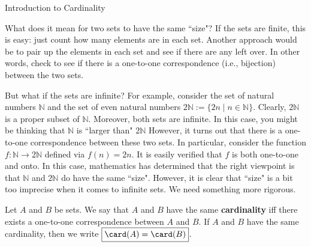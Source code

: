 \begin{section}{Introduction to Cardinality}

What does it mean for two sets to have the same ``size"?  If the sets are finite, this is easy: just count how many elements are in each set.  Another approach would be to pair up the elements in each set and see if there are any left over.  In other words, check to see if there is a one-to-one correspondence (i.e., bijection) between the two sets.  

But what if the sets are infinite?  For example, consider the set of natural numbers $\mathbb{N}$ and the set of even natural numbers $2\mathbb{N}:=\{2n\mid n\in \mathbb{N}\}$. Clearly, $2\mathbb{N}$ is a proper subset of $\mathbb{N}$.  Moreover, both sets are infinite.  In this case, you might be thinking that $\mathbb{N}$ is ``larger than" $2\mathbb{N}$  However, it turns out that there is a one-to-one correspondence between these two sets.  In particular, consider the function $f:\mathbb{N}\to 2\mathbb{N}$ defined via $f(n)=2n$.  It is easily verified that $f$ is both one-to-one and onto.  In this case, mathematics has determined that the right viewpoint is that $\mathbb{N}$ and $2\mathbb{N}$ do have the same ``size". However, it is clear that ``size" is a bit too imprecise when it comes to infinite sets. We need something more rigorous.

\begin{definition}
Let $A$ and $B$ be sets. We say that $A$ and $B$ have the same \textbf{cardinality} iff there exists a one-to-one correspondence between $A$ and $B$. If $A$ and $B$ have the same cardinality, then we write $\boxed{\card(A)=\card(B)}$.
\end{definition}


\end{section}
